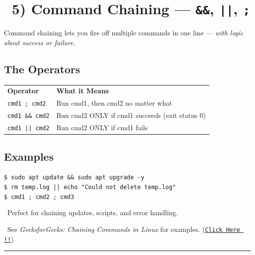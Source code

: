 \documentclass[12pt]{article}
\newcommand{\chainicon}{\faLink}
\newcommand{\arrowicon}{\faArrowRight}
\begin{document}
\section*{\chainicon\ 5) \textbf{Command Chaining — \texttt{\&\&}, \texttt{||}, \texttt{;}}}

Command chaining lets you fire off multiple commands in one line — \textit{with logic about success or failure}.

\subsection*{The Operators}

\begin{infobox}
\begin{tabular}{ll}
\textbf{Operator} & \textbf{What it Means} \\
\texttt{cmd1 ; cmd2} & Run cmd1, then cmd2 no matter what \\
\texttt{cmd1 \&\& cmd2} & Run cmd2 ONLY if cmd1 succeeds (exit status 0) \\
\texttt{cmd1 || cmd2} & Run cmd2 ONLY if cmd1 fails \\
\end{tabular}
\end{infobox}

\subsection*{Examples}

\begin{highlightbox}
\texttt{\$ sudo apt update \&\& sudo apt upgrade -y}\\
\texttt{\$ rm temp.log || echo "Could not delete temp.log"}\\
\texttt{\$ cmd1 ; cmd2 ; cmd3}
\end{highlightbox}

\begin{infobox}
\faCheckCircle\ Perfect for chaining updates, scripts, and error handling.
\end{infobox}

\begin{infobox}
\arrowicon\ See \textit{GeeksforGeeks: Chaining Commands in Linux} for examples. (\href{https://www.geeksforgeeks.org/linux-unix/chaining-commands-in-linux/}{\texttt{Click Here !!}})
\end{infobox}

\vspace{1em}
\begin{center}
\color{teamred}\rule{0.8\textwidth}{1pt}
\end{center}
\end{document}
